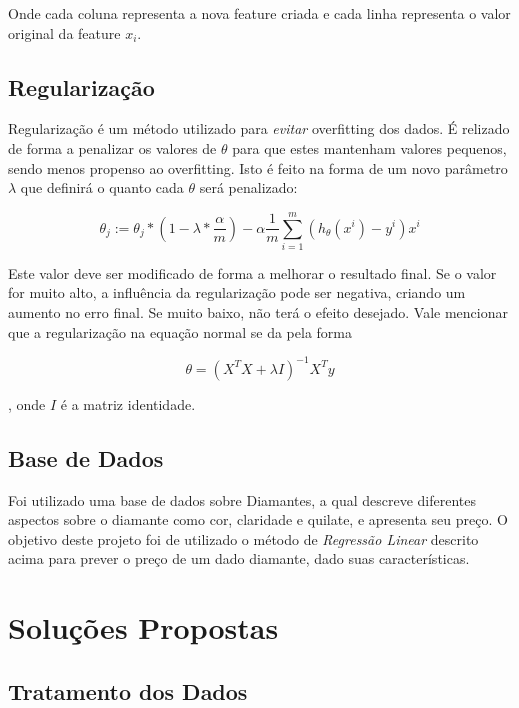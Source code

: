 \documentclass[conference]{IEEEtran}
\begin{document}
Onde cada coluna representa a nova feature criada e cada linha representa o valor original da feature $x_{i}$.

\subsection{Regularização}

Regularização é um método utilizado para \textit{evitar} overfitting dos dados. É relizado de forma a penalizar os valores de $\theta$ para que estes mantenham valores pequenos, sendo menos propenso ao overfitting. Isto é feito na forma de um novo parâmetro $\lambda$ que definirá o quanto cada $\theta$ será penalizado:

\begin{equation} \label{eq:regularization}
\theta_{j} := \theta_{j} * (1 - \lambda * \dfrac{\alpha}{m}) - \alpha \dfrac{1}{m} \sum_{i=1}^{m}(h_{\theta}(x^{i}) - y^{i}) x^{i}
\end{equation}

Este valor deve ser modificado de forma a melhorar o resultado final. Se o valor for muito alto, a influência da regularização pode ser negativa, criando um aumento no erro final. Se muito baixo, não terá o efeito desejado. Vale mencionar que a regularização na equação normal se da pela forma

\begin{equation} \label{eq:normal_reg}
\theta = (X^{T}X + \lambda I)^{-1}X^{T}y
\end{equation}

, onde $I$ é a matriz identidade.

\subsection{Base de Dados}

Foi utilizado uma base de dados sobre Diamantes, a qual descreve diferentes aspectos sobre o diamante como cor, claridade e quilate, e apresenta seu preço. O objetivo deste projeto foi de utilizado o método de \textit{Regressão Linear} descrito acima para prever o preço de um dado diamante, dado suas características.

\section{Soluções Propostas}

\subsection{Tratamento dos Dados}
\end{document}
